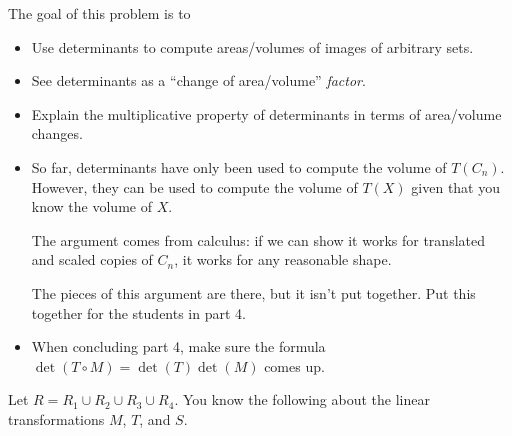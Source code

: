 \documentclass{workbook}
\newcommand{\bookonlynewpage}{\begin{bookonly}\newpage\end{bookonly}}
\begin{document}
\begin{slide}
	\bookonlynewpage
	\question
	\begin{annotation}
		\begin{goals}

			The goal of this problem is to
			\begin{itemize}
				\item Use determinants to compute areas/volumes of images of
					arbitrary sets.
				\item See determinants as a ``change of area/volume'' \emph{factor}.
				\item Explain the multiplicative property of determinants in
					terms of area/volume changes.
			\end{itemize}
		\end{goals}

		\begin{notes}
			\begin{itemize}
				\item So far, determinants have only been used to compute
					the volume of $T(C_n)$. However, they can be used to compute
					the volume of $T(X)$ given that you know the volume of $X$.

					The argument comes from calculus: if we can show it works
					for translated and scaled copies of $C_n$, it works for any
					reasonable shape.

					The pieces of this argument are there, but it isn't put together.
					Put this together for the students in part 4.
				\item When concluding part 4, make sure the formula $\det(T\circ M)=
					\det(T)\det(M)$ comes up.
			\end{itemize}
		\end{notes}
	\end{annotation}
\begin{minipage}{.45\textwidth}
\hspace{.55cm}
\end{minipage}
\begin{minipage}{.5\textwidth}
	Let $R=R_1\cup R_2\cup R_3\cup R_4$. You know the following about the linear transformations $M$, $T$, and $S$.


\end{minipage}
\end{slide}
\end{document}
